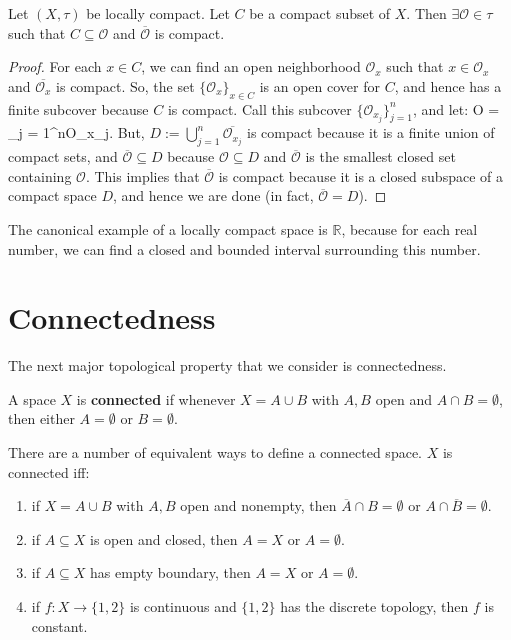 	\begin{prop}
		Let $(X, \tau)$ be locally compact. Let $C$ be a compact subset of $X$. Then $\exists\mathcal O\in\tau$ such 
		that $C\subseteq\mathcal O$ and $\overline{\mathcal O}$ is compact.
	\end{prop}
	
	\begin{proof}
		For each $x\in C$, we can find an open neighborhood $\mathcal O_x$ such that $x\in\mathcal O_x$ and 
		$\overline{\mathcal O_x}$ is compact. So, the set $\{\mathcal O_x\}_{x\in C}$ is an open cover for $C$, and 
		hence has a finite subcover because $C$ is compact. Call this subcover $\{\mathcal O_{x_j}\}_{j = 1}^n$, and 
		let:
		\eq
			\mathcal O = \bigcup_{j = 1}^n\mathcal O_{x_j}.
		\qe
		But, $ D := \bigcup_{j = 1}^n\overline{\mathcal O_{x_j}}$ is compact because it is a finite union of compact sets, 
		and $\overline{\mathcal O}\subseteq D$ because $\mathcal O\subseteq D$ and $\overline{\mathcal O}$ is the 
		smallest closed set containing $\mathcal O$. This implies that $\overline{\mathcal O}$ is compact because it 
		is a closed subspace of a compact space $D$, and hence we are done (in fact, $\overline{\mathcal O} = D$).
	\end{proof}
	
	The canonical example of a locally compact space is $\mathbb R$, because for each real number, we can find a 
	closed and bounded interval surrounding this number.

\newpage
	
\section{Connectedness}
	
	The next major topological property that we consider is connectedness. 
	
	\begin{definition}[Connectedness]
		A space $X$ is \textbf{connected} if whenever $X = A\cup B$ with $A, B$ open and $A\cap B = \emptyset$, then 
		either $A = \emptyset$ or $B = \emptyset$. 
	\end{definition}
	
	There are a number of equivalent ways to define a connected space. $X$ is connected iff:
	\begin{enumerate}
		\item if $X = A\cup B$ with $A, B$ open and nonempty, then $\overline A\cap B = \emptyset$ or $A\cap\overline B = 
			\emptyset$. 
		\item if $A\subseteq X$ is open and closed, then $A = X$ or $A = \emptyset$. 
		\item if $A\subseteq X$ has empty boundary, then $A = X$ or $A = \emptyset$. 
		\item if $f : X\rightarrow \{1, 2\}$ is continuous and $\{1, 2\}$ has the discrete topology, then $f$ is constant.
	\end{enumerate}
	
